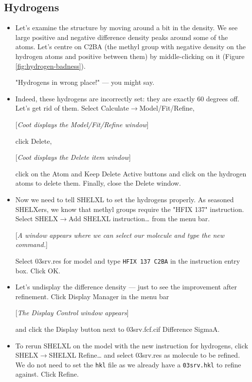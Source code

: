 \documentclass{article}
\begin{document}
\subsection{Hydrogens}
\begin{itemize}
\item Let's examine the structure by moving around a bit in the
  density. We see large positive and negative difference density peaks
  around some of the atoms. Let's centre on C2BA (the methyl group
  with negative density on the hydrogen atoms and positive between
  them) by middle-clicking on it (Figure \ref{fig:hydrogen-badness}).

"Hydrogens in wrong place!" --- you might say.

\item Indeed, these hydrogens are incorrectly set: they are exactly 60
  degrees off. Let's get rid of them. Select
  \textsf{Calculate$\to$Model/Fit/Refine},

[\textsl{Coot displays the Model/Fit/Refine window}]

click \textsf{Delete}, 

[\textsl{Coot displays the Delete item window}]

click on the \textsf{Atom} and \textsf{Keep Delete Active} buttons and
click on the hydrogen atoms to delete them. Finally, close the
\textsf{Delete} window.

\item Now we need to tell SHELXL to set the hydrogens properly. As
  seasoned SHELXers, we know that methyl groups require the "HFIX 137"
  instruction. Select \textsf{SHELX$\to$Add SHELXL instruction\ldots}
  from the menu bar.

[\textsl{A window appears where we can select our molecule and type the new command.}]

Select 03srv.res for model and type \texttt{HFIX 137 C2BA} in the
instruction entry box. Click \textsf{OK}.

\item Let's undisplay the difference density --- just to see the
  improvement after refinement. Click \textsf{Display Manager} in the
  menu bar

[\textsl{The Display Control window appears}]

and click the \textsf{Display} button next to \textsf{03srv.fcf.cif Difference SigmaA}.

\item To rerun SHELXL on the model with the new instruction for
  hydrogens, click \textsf{SHELX$\to$SHELXL Refine\ldots} and select
  03srv.res as molecule to be refined. We do not need to set the
  \texttt{hkl} file as we already have a \texttt{03srv.hkl} to refine
  against. Click \textsf{Refine}.


\end{itemize}
\end{document}
